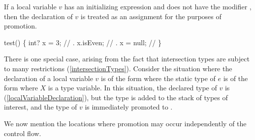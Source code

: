 \documentclass[makeidx]{article}
\begin{document}
\LMHash{}%
If a local variable $v$ has an initializing expression
and does not have the modifier \FINAL,
%
then the declaration of $v$ is treated as an assignment
for the purposes of promotion.


\begin{dartCode}
\VOID test() \{
  int? x = 3; // .
  x.isEven; // .
  x = null; // 
\}
\end{dartCode}

\LMHash{}%
There is one special case,
arising from the fact that intersection types
are subject to many restrictions
(\ref{intersectionTypes}).
Consider the situation
where the declaration of a local variable $v$ is of the form
where the static type of $e$ is of the form 
where $X$ is a type variable.
In this situation, the declared type of $v$ is 
(\ref{localVariableDeclaration}),
but the type  is added to the stack of types of interest,
and the type of $v$ is immediately promoted to .


\LMHash{}%
We now mention the locations where promotion may occur
independently of the control flow.

\end{document}
